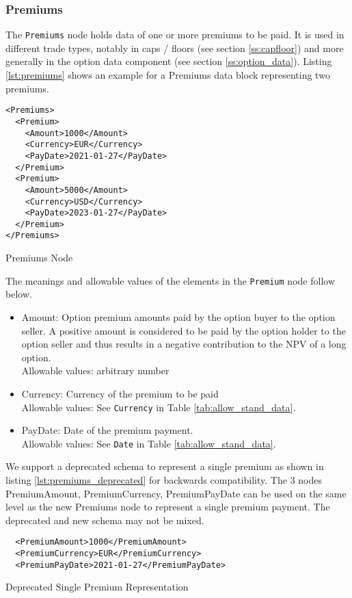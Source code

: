 \subsubsection{Premiums}
\label{ss:premiums}

The \lstinline!Premiums! node holds data of one or more premiums to be paid. It is used in different trade types,
notably in caps / floors (see section \ref{ss:capfloor}) and more generally in the option data component (see section
\ref{ss:option_data}). Listing \ref{lst:premiums} shows an example for a Premiums data block representing two premiums.

\begin{listing}[H]
\begin{verbatim}
<Premiums>
  <Premium>
    <Amount>1000</Amount>
    <Currency>EUR</Currency>
    <PayDate>2021-01-27</PayDate>
  </Premium>
  <Premium>
    <Amount>5000</Amount>
    <Currency>USD</Currency>
    <PayDate>2023-01-27</PayDate>
  </Premium>
</Premiums>
\end{verbatim}
\caption{Premiums Node}
\label{lst:premiums}
\end{listing}

The meanings and allowable values of the elements in the \lstinline!Premium! node follow below.

\begin{itemize}
\item Amount: Option premium amounts paid by the option buyer to the option seller. A positive amount is considered to be paid by the option holder to the option seller and thus results in a negative contribution to the NPV of a long option. \\
  Allowable values: arbitrary number
\item Currency: Currency of the premium to be paid\\
  Allowable values:  See \lstinline!Currency! in Table \ref{tab:allow_stand_data}.
\item PayDate: Date of the premium payment.\\
  Allowable values:  See \lstinline!Date! in Table \ref{tab:allow_stand_data}.
\end{itemize}

We support a deprecated schema to represent a single premium as shown in listing \ref{lst:premiums_deprecated} for
backwards compatibility. The $3$ nodes PremiumAmount, PremiumCurrency, PremiumPayDate can be used on the same level as
the new Premiums node to represent a single premium payment. The deprecated and new schema may not be mixed.

\begin{listing}[H]
\begin{verbatim}
  <PremiumAmount>1000</PremiumAmount>
  <PremiumCurrency>EUR</PremiumCurrency>
  <PremiumPayDate>2021-01-27</PremiumPayDate>
\end{verbatim}
\caption{Deprecated Single Premium Representation}
\label{lst:premiums_deprecated}
\end{listing}
